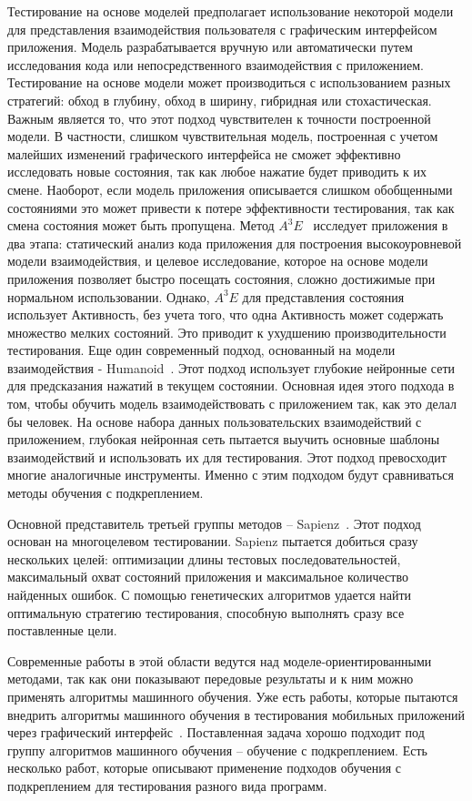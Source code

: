 Тестирование на основе моделей предполагает использование некоторой модели для представления взаимодействия пользователя с графическим интерфейсом приложения. Модель разрабатывается вручную или автоматически путем исследования кода или непосредственного взаимодействия с приложением. Тестирование на основе модели может производиться с использованием разных стратегий: обход в глубину, обход в ширину, гибридная или стохастическая. Важным является то, что этот подход чувствителен к точности построенной модели. В частности, слишком чувствительная модель, построенная с учетом малейших изменений графического интерфейса не сможет эффективно исследовать новые состояния, так как любое нажатие будет приводить к их смене. Наоборот, если модель приложения описывается слишком обобщенными состояниями это может привести к потере эффективности тестирования, так как смена состояния может быть пропущена. Метод $A^3E$~\cite{azim2013targeted} исследует приложения в два этапа: статический анализ кода приложения для построения высокоуровневой модели взаимодействия, и целевое исследование, которое на основе модели приложения позволяет быстро посещать состояния, сложно достижимые при нормальном использовании. Однако, $A^3E$ для представления состояния использует Активность, без учета того, что одна Активность может содержать множество мелких состояний. Это приводит к ухудшению производительности тестирования. Еще один современный подход, основанный на модели взаимодействия - Humanoid~\cite{li2019deep}. Этот подход использует глубокие нейронные сети для предсказания нажатий в текущем состоянии. Основная идея этого подхода в том, чтобы обучить модель взаимодействовать с приложением так, как это делал бы человек. На основе набора данных пользовательских взаимодействий с приложением, глубокая нейронная сеть пытается выучить основные шаблоны взаимодействий и использовать их для тестирования. Этот подход превосходит многие аналогичные инструменты. Именно с этим подходом будут сравниваться методы обучения с подкреплением.

Основной представитель третьей группы методов -- Sapienz~\cite{mao2016sapienz}. Этот подход основан на многоцелевом тестировании. Sapienz пытается добиться  сразу нескольких целей: оптимизации длины тестовых последовательностей, максимальный охват состояний приложения и максимальное количество найденных ошибок. С помощью генетических алгоритмов удается найти оптимальную стратегию тестирования, способную выполнять сразу все поставленные цели.

Современные работы в этой области ведутся над моделе-ориентированными методами, так как они показывают передовые результаты и к ним можно применять алгоритмы машинного обучения. Уже есть работы, которые пытаются внедрить алгоритмы машинного обучения в тестирования мобильных приложений через графический интерфейс~\cite{li2019deep, harries2020drift}. Поставленная задача хорошо подходит под группу алгоритмов машинного обучения -- обучение с подкреплением. Есть несколько работ, которые описывают применение подходов обучения с подкреплением для тестирования разного вида программ.

